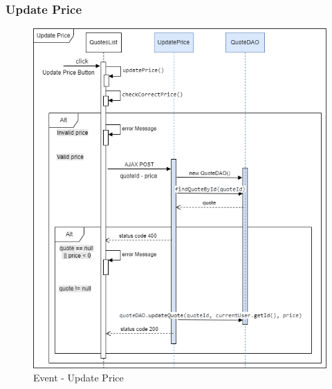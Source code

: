 \documentclass[a4paper, 12pt]{article}
\begin{document}
\subsubsection{Update Price}
\begin{figure}[h!]
	\centering
	\includegraphics[width=1\textwidth]{RIA_images/UpdatePrice.png}
	\caption{Event - Update Price}
	\label{figure:UpdatePriceRIA}
\end{figure}
\end{document}
